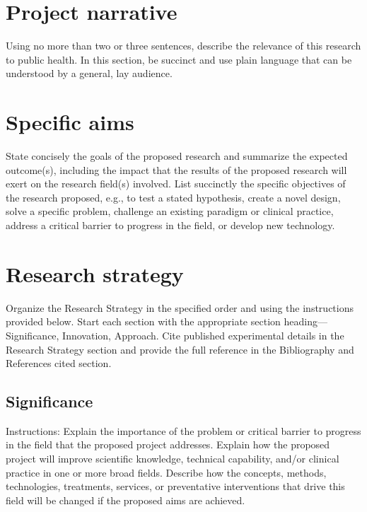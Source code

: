 \documentclass[12pt]{article}
\newcommand{\instructions}[1]{}
\renewcommand{\instructions}[1]{{\scriptsize \sc #1}}
\begin{document}
\section*{Project narrative}

\instructions{ Using no more than two or three sentences, describe the
    relevance of this research to public health. In this section, be
    succinct and use plain language that can be understood by a
    general, lay audience.}


\clearpage
\section*{Specific aims}

\instructions{State concisely the goals of the proposed research and
    summarize the expected outcome(s), including the impact that the
    results of the proposed research will exert on the research
    field(s) involved.  List succinctly the specific objectives of the
    research proposed, e.g., to test a stated hypothesis, create a
    novel design, solve a specific problem, challenge an existing
    paradigm or clinical practice, address a critical barrier to
    progress in the field, or develop new technology.}


\clearpage
\section*{Research strategy}

\instructions{ Organize the Research Strategy in the specified order
    and using the instructions provided below. Start each section with
    the appropriate section heading---Significance, Innovation,
    Approach. Cite published experimental details in the Research
    Strategy section and provide the full reference in the
    Bibliography and References cited section.}

\subsection*{Significance}

\instructions{ Instructions: Explain the importance of the problem or
    critical barrier to progress in the field that the proposed
    project addresses.  Explain how the proposed project will improve
    scientific knowledge, technical capability, and/or clinical
    practice in one or more broad fields.  Describe how the concepts,
    methods, technologies, treatments, services, or preventative
    interventions that drive this field will be changed if the
    proposed aims are achieved.}
\end{document}
